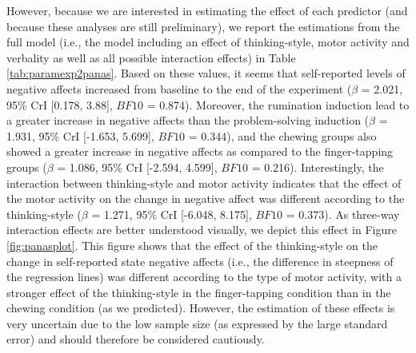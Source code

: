 \documentclass[a4paper,12pt,twoside,openright,oldfontcommands,final]{memoir}
\begin{document}
However, because we are interested in estimating the effect of each predictor (and because these analyses are still preliminary), we report the estimations from the full model (i.e., the model including an effect of thinking-style, motor activity and verbality as well as all possible interaction effects) in Table \ref{tab:paramexp2panas}. Based on these values, it seems that self-reported levels of negative affects increased from baseline to the end of the experiment (\(\beta\) = 2.021, 95\% CrI {[}0.178, 3.88{]}, \(BF10\) = 0.874). Moreover, the rumination induction lead to a greater increase in negative affects than the problem-solving induction (\(\beta\) = 1.931, 95\% CrI {[}-1.653, 5.699{]}, \(BF10\) = 0.344), and the chewing groups also showed a greater increase in negative affects as compared to the finger-tapping groups (\(\beta\) = 1.086, 95\% CrI {[}-2.594, 4.599{]}, \(BF10\) = 0.216). Interestingly, the interaction between thinking-style and motor activity indicates that the effect of the motor activity on the change in negative affect was different according to the thinking-style (\(\beta\) = 1.271, 95\% CrI {[}-6.048, 8.175{]}, \(BF10\) = 0.373). As three-way interaction effects are better understood visually, we depict this effect in Figure \ref{fig:panasplot}. This figure shows that the effect of the thinking-style on the change in self-reported state negative affects (i.e., the difference in steepness of the regression lines) was different according to the type of motor activity, with a stronger effect of the thinking-style in the finger-tapping condition than in the chewing condition (as we predicted). However, the estimation of these effects is very uncertain due to the low sample size (as expressed by the large standard error) and should therefore be considered cautiously.
\end{document}
